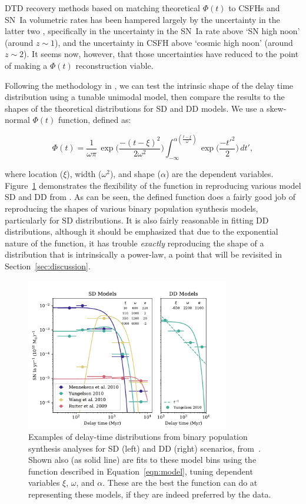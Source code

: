 \documentclass[apj, twocolumn]{aastex62}
\begin{document}
DTD recovery methods based on matching theoretical $\Phi(t)$ to CSFHs and SN~Ia volumetric rates has been hampered largely by the uncertainty in the latter two \citep{Dahlen:2008,Strolger:2010,Graur:2014,Rodney:2014fj}, specifically in the uncertainty in the SN~Ia rate above `SN high noon' (around $z\sim1$), and the uncertainty in CSFH above `cosmic high noon' (around $z\sim2$). It seems now, however, that those uncertainties have reduced to the point of making a $\Phi(t)$ reconstruction viable.

Following the methodology in \cite{Strolger:2010}, we can test the intrinsic shape of the delay time distribution using a tunable unimodal model, then compare the results to the shapes of the theoretical distributions for SD and DD models. We use a skew-normal $\Phi(t)$ function, defined as:

\begin{equation}
	\Phi(t)=\frac{1}{\omega\pi}\,\exp\biggl(\frac{-(t-\xi)^2}{2\omega^2}\biggr)\int_{-\infty}^{\alpha (\frac{t-\xi}{\omega})} \exp\biggl(\frac{-t'^2}{2}\biggr)\,dt',
\label{eqn:model}
\end{equation}

\noindent where location ($\xi$), width ($\omega^2$), and shape ($\alpha$) are the dependent variables. Figure~\ref{fig:dtd_families} demonstrates the flexibility of the function in reproducing various model SD and DD from \cite{Nelemans:2013}. As can be seen, the defined function does a fairly good job of reproducing the shapes of various binary population synthesis models, particularly for SD distributions. It is also fairly reasonable in fitting DD distributions, although it should be emphasized that due to the exponential nature of the function, it has trouble \textit{exactly} reproducing the shape of a distribution that is intrinsically a power-law, a point that will be revisited in Section~\ref{sec:discussion}.

\begin{figure}[t]
   \centering
   \includegraphics[width=3.5in]{figure_sd_dd_fits.pdf}
   \caption{\footnotesize Examples of delay-time distributions from binary population synthesis analyses for SD (left) and DD (right) scenarios, from~\cite{Nelemans:2013}. Shown also (as solid line) are fits to these model bins using the function described in Equation~\ref{eqn:model}, tuning dependent variables $\xi$, $\omega$, and $\alpha$. These are the best the function can do at representing these models, if they are indeed preferred by the data.}
   \label{fig:dtd_families}
\end{figure}
\end{document}
